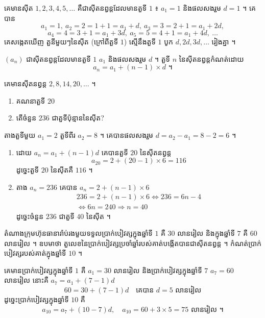 \begin{example}[ឧទាហរណ៍]
គេមានស៊ីត $1, 2, 3, 4, 5, \ldots$ គឺជាស៊ីតនព្វន្តដែលមានតួទី $1$ ៖ $a_1 = 1$ និងផលសងរួម $d = 1$ ។ គេបាន
\[
a_1 = 1,\ a_2 = 2 = 1 + 1 = a_1 + d,\ a_3 = 3 = 2 + 1 = a_1 + 2d,
\]
\[
a_4 = 4 = 3 + 1 = a_1 + 3d,\ a_5 = 5 = 4 + 1 = a_1 + 4d,\ \ldots
\]
គេសង្កេតឃើញ តួនីមួយៗនៃស៊ីត (ក្រៅពីតួទី $1$) ស្មើនឹងតួទី $1$ បូក $d, 2d, 3d, \ldots$ រៀងគ្នា ។
\end{example}

\begin{formulaBox}[ជាទូទៅ]
$(a_n)$ ជាស៊ីតនព្វន្តដែលមានតួទី $1$ $a_1$ និងផលសងរួម $d$ ។ តួទី $n$ នៃស៊ីតនព្វន្តកំណត់ដោយ
\[
a_n = a_1 + (n - 1) \times d \text{ ។}
\]
\end{formulaBox}

\begin{example}[លំហាត់គំរូ ១]
គេមានស៊ីតនព្វន្ត $2, 8, 14, 20, \ldots$ ។
\begin{enumerate}[a]
  \item គណនាតួទី $20$
  \item តើចំនួន $236$ ជាតួទីប៉ុន្មាននៃស៊ីត?
\end{enumerate}
\end{example}
\ans
តាងតួទីមួយ $a_1 = 2$ តួទីពីរ $a_2 = 8$ ។ គេបានផលសងរួម $d = a_2 - a_1 = 8 - 2 = 6$ ។
\begin{enumerate}[a]
  \item ដោយ $a_n = a_1 + (n - 1)d$ គេបានតួទី $20$ នៃស៊ីតនព្វន្ត
  \[ a_{20} = 2 + (20 - 1) \times 6 = 116 \]
  ដូច្នេះតួទី $20$ នៃស៊ីតគឺ $116$ ។
  \item តាង $a_n = 236$ គេបាន $a_n = 2 + (n - 1) \times 6$
  \[ \begin{gathered} 236 = 2 + (n - 1) \times 6 \iff 236 = 6n - 4\\ \iff 6n = 240 \Rightarrow n = 40 \end{gathered} \]
  ដូច្នេះចំនួន $236$ ជាតួទី $40$ នៃស៊ីត ។
\end{enumerate}

\begin{example}[លំហាត់គំរូ ២]
តំណាងក្រុមហ៊ុនធានារ៉ាប់រងមួយទទួលប្រាក់បៀវត្សក្នុងឆ្នាំទី $1$ គឺ $30$ លានរៀល និងក្នុងឆ្នាំទី $7$ គឺ $60$ លានរៀល ។ ឧបមាថា តួលេខនៃប្រាក់បៀវត្សប្រចាំឆ្នាំរបស់គាត់បង្កើតបានជាស៊ីតនព្វន្ត ។ កំណត់ប្រាក់បៀវត្សរបស់គាត់ក្នុងឆ្នាំទី $10$ ។
\end{example}
\ans
គេមានប្រាក់បៀវត្សក្នុងឆ្នាំទី $1$ គឺ $a_1 = 30$ លានរៀល និងប្រាក់បៀវត្សក្នុងឆ្នាំទី $7$ $a_7 = 60$ លានរៀល នោះគឺ $a_7 = a_1 + (7 - 1)d$
\[ 60 = 30 + (7 - 1)d \quad \text{គេបាន } d = 5 \text{ លានរៀល} \]
ដូច្នេះប្រាក់បៀវត្សក្នុងឆ្នាំទី $10$ គឺ
\[ a_{10} = a_7 + (10 - 7)d,\quad a_{10} = 60 + 3 \times 5 = 75 \text{ លានរៀល ។} \]

